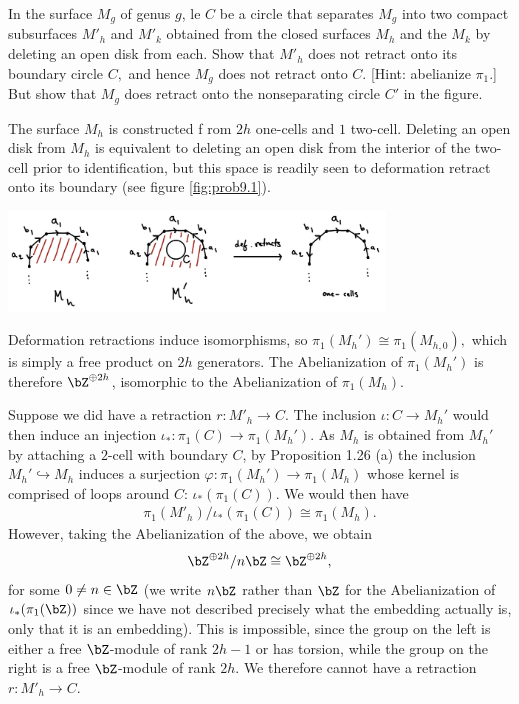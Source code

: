 \begin{homework}[e]
   In the surface $M_g$ of genus $g$, le $C$ be a circle that separates $M_g$ into two compact subsurfaces $M'_h$ and $M'_k$ obtained from the closed surfaces $M_h$ and the $M_k$ by deleting an open disk from each. Show that $M'_h$ does not retract onto its boundary circle $C,$ and hence $M_g$ does not retract onto $C$. [Hint: abelianize $\pi_1$.] But show that $M_g$ does retract onto the nonseparating circle $C'$ in the figure.
  \begin{prf}
    The surface $M_h$ is constructed f rom $2h$ one-cells and $1$ two-cell. Deleting an open disk from $M_h$ is equivalent to deleting an open disk from the interior of the two-cell prior to identification, but this space is readily seen to deformation retract onto its boundary (see figure \ref{fig:prob9.1}).
    \begin{center}
      \includegraphics[width=10cm]{figures/hwk4-fig0.png}
      \label{fig:prob9.1}
    \end{center}
    Deformation retractions induce isomorphisms, so $\pi_1(M_h') \cong \pi_1(M_{h,0}),$ which is simply a free product on $2h$ generators. The Abelianization of $\pi_1(M_h')$ is therefore $\bZ^{\oplus 2h}$, isomorphic to the Abelianization of $\pi_1(M_h)$.

    Suppose we did have a retraction $r:M'_h \to C$. The inclusion $\iota:C\to M_h'$ would then induce an injection $\iota_*:\pi_1(C) \to \pi_1(M_h')$. As $M_h$ is obtained from $M_h'$ by attaching a $2$-cell with boundary $C$, by Proposition 1.26 (a) the inclusion $M_h' \hookrightarrow M_h$ induces a surjection $\varphi:\pi_1(M_h')\to \pi_1(M_h)$ whose kernel is comprised of loops around $C$: $\iota_*(\pi_1(C))$. We would then have
    \begin{align*}
      \pi_1(M'_h)/\iota_*(\pi_1(C)) \cong \pi_1(M_h).
    \end{align*}
    However, taking the Abelianization of the above, we obtain
    \begin{align*}
      \bZ^{\oplus 2h}/n\bZ \cong \bZ^{\oplus 2h},
    \end{align*}
    for some $0 \neq n \in \bZ$ (we write $n\bZ$ rather than $\bZ$ for the Abelianization of $\iota_*(\pi_1(\bZ))$ since we have not described precisely what the embedding actually is, only that it is an embedding). This is impossible, since the group on the left is either a free $\bZ$-module of rank $2h - 1$ or has torsion, while the group on the right is a free $\bZ$-module of rank $2h$. We therefore cannot have a retraction $r:M'_h \to C$.


\end{prf}
\end{homework}
